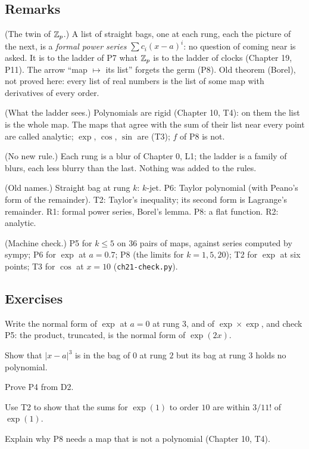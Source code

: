 \subsection*{Remarks}

\begin{lines}
\item[\lab{R1}] (The twin of $\mathbb{Z}_p$.) A list of straight bags, one at each rung, each the picture of the next, is a \emph{formal power series} $\sum c_i (x - a)^i$: no question of coming near is asked. It is to the ladder of P7 what $\mathbb{Z}_p$ is to the ladder of clocks (Chapter 19, P11). The arrow ``map $\mapsto$ its list'' forgets the germ (P8). Old theorem (Borel), not proved here: every list of real numbers is the list of some map with derivatives of every order.
\item[\lab{R2}] (What the ladder sees.) Polynomials are rigid (Chapter 10, T4): on them the list is the whole map. The maps that agree with the sum of their list near every point are called analytic; $\exp$, $\cos$, $\sin$ are (T3); $f$ of P8 is not.
\item[\lab{R3}] (No new rule.) Each rung is a blur of Chapter 0, L1; the ladder is a family of blurs, each less blurry than the last. Nothing was added to the rules.
\item[\lab{R4}] (Old names.) Straight bag at rung $k$: $k$-jet. P6: Taylor polynomial (with Peano's form of the remainder). T2: Taylor's inequality; its second form is Lagrange's remainder. R1: formal power series, Borel's lemma. P8: a flat function. R2: analytic.
\item[\lab{R5}] (Machine check.) P5 for $k \le 5$ on $36$ pairs of maps, against series computed by sympy; P6 for $\exp$ at $a = 0.7$; P8 (the limits for $k = 1, 5, 20$); T2 for $\exp$ at six points; T3 for $\cos$ at $x = 10$ (\texttt{ch21-check.py}).
\end{lines}

\subsection*{Exercises}

\begin{lines}
\item[\lab{E1}] Write the normal form of $\exp$ at $a = 0$ at rung $3$, and of $\exp \times \exp$, and check P5: the product, truncated, is the normal form of $\exp(2x)$.
\item[\lab{E2}] Show that $|x - a|^3$ is in the bag of $0$ at rung $2$ but its bag at rung $3$ holds no polynomial.
\item[\lab{E3}] Prove P4 from D2.
\item[\lab{E4}] Use T2 to show that the sums for $\exp(1)$ to order $10$ are within $3/11!$ of $\exp(1)$.
\item[\lab{E5}] Explain why P8 needs a map that is not a polynomial (Chapter 10, T4).
\end{lines}

